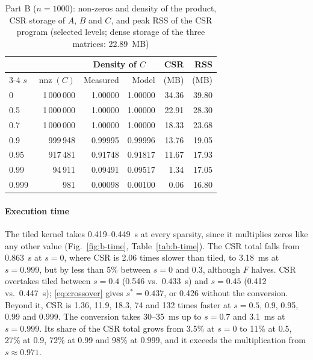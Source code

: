 \documentclass[conference,a4paper]{IEEEtran}
\newcommand{\nnz}{\operatorname{nnz}}
\begin{document}
\begin{table}[t]
  \centering
  \caption{Part B ($n = 1000$): non-zeros and density of the product, CSR
           storage of $A$, $B$ and $C$, and peak RSS of the CSR program
           (selected levels; dense storage of the three matrices: 22.89~MB)}
  \label{tab:b-fill}
  \footnotesize
  \setlength{\tabcolsep}{3.6pt}
  \begin{tabular}{@{}lrrrrr@{}}
    \toprule
    & & \multicolumn{2}{c}{\textbf{Density of $C$}} & \textbf{CSR} & \textbf{RSS} \\
    \cmidrule(lr){3-4}
    $s$ & $\nnz(C)$ & Measured & Model & (MB) & (MB) \\
    \midrule
    0     & 1\,000\,000 & 1.00000 & 1.00000 & 34.36 & 39.80 \\
    0.5   & 1\,000\,000 & 1.00000 & 1.00000 & 22.91 & 28.30 \\
    0.7   & 1\,000\,000 & 1.00000 & 1.00000 & 18.33 & 23.68 \\
    0.9   & 999\,948    & 0.99995 & 0.99996 & 13.76 & 19.05 \\
    0.95  & 917\,481    & 0.91748 & 0.91817 & 11.67 & 17.93 \\
    0.99  & 94\,911     & 0.09491 & 0.09517 & 1.34  & 17.05 \\
    0.999 & 981         & 0.00098 & 0.00100 & 0.06  & 16.80 \\
    \bottomrule
  \end{tabular}
\end{table}

\paragraph{Execution time} The tiled kernel takes 0.419--0.449~s at every
sparsity, since it multiplies zeros like any other value
(Fig.~\ref{fig:b-time}, Table~\ref{tab:b-time}). The CSR total falls from
0.863~s at $s = 0$, where CSR is 2.06 times slower than tiled, to 3.18~ms at
$s = 0.999$, but by less than 5\% between $s = 0$ and $0.3$, although $F$
halves. CSR overtakes tiled between $s = 0.4$ (0.546 vs.\ 0.433~s) and
$s = 0.45$ (0.412 vs.\ 0.447~s); \eqref{eq:crossover} gives $s^* = 0.437$, or
0.426 without the conversion. Beyond it, CSR is 1.36, 11.9, 18.3, 74 and 132
times faster at $s = 0.5$, 0.9, 0.95, 0.99 and 0.999. The conversion takes
30--35~ms up to $s = 0.7$ and 3.1~ms at $s = 0.999$. Its share of the CSR total
grows from 3.5\% at $s = 0$ to 11\% at 0.5, 27\% at 0.9, 72\% at 0.99 and 98\%
at 0.999, and it exceeds the multiplication from $s \approx 0.971$.
\end{document}
